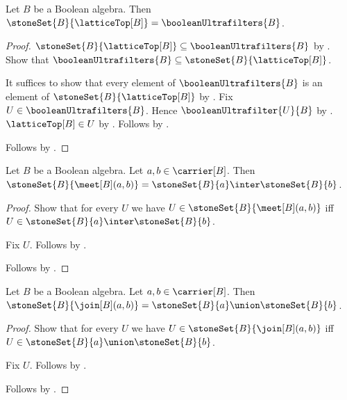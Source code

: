 \begin{proposition}\label{stone_set_lattice_top}
    Let $B$ be a Boolean algebra.
    Then $\stoneSet{B}{\latticeTop[B]}=\booleanUltrafilters{B}$.
\end{proposition}
\begin{proof}
    $\stoneSet{B}{\latticeTop[B]}
        \subseteq\booleanUltrafilters{B}$ by
        .
    Show that $\booleanUltrafilters{B}
        \subseteq\stoneSet{B}{\latticeTop[B]}$.
    \begin{subproof}
        It suffices to show that every element of $\booleanUltrafilters{B}$
            is an element of $\stoneSet{B}{\latticeTop[B]}$ by
            .
        Fix $U\in\booleanUltrafilters{B}$.
        Hence $\booleanUltrafilter{U}{B}$ by
            .
        $\latticeTop[B]\in U$ by .
        Follows by .
    \end{subproof}
    Follows by .
\end{proof}

\begin{proposition}\label{stone_set_meet}
    Let $B$ be a Boolean algebra.
    Let $a,b\in\carrier[B]$.
    Then $\stoneSet{B}{\meet[B](a,b)}=
        \stoneSet{B}{a}\inter\stoneSet{B}{b}$.
\end{proposition}
\begin{proof}
    Show that for every $U$ we have
        $U\in\stoneSet{B}{\meet[B](a,b)}$ iff
        $U\in\stoneSet{B}{a}\inter\stoneSet{B}{b}$.
    \begin{subproof}
        Fix $U$.
        Follows by
            .
    \end{subproof}
    Follows by .
\end{proof}

\begin{proposition}\label{stone_set_join}
    Let $B$ be a Boolean algebra.
    Let $a,b\in\carrier[B]$.
    Then $\stoneSet{B}{\join[B](a,b)}=
        \stoneSet{B}{a}\union\stoneSet{B}{b}$.
\end{proposition}
\begin{proof}
    Show that for every $U$ we have
        $U\in\stoneSet{B}{\join[B](a,b)}$ iff
        $U\in\stoneSet{B}{a}\union\stoneSet{B}{b}$.
    \begin{subproof}
        Fix $U$.
        Follows by
            .
    \end{subproof}
    Follows by .
\end{proof}

